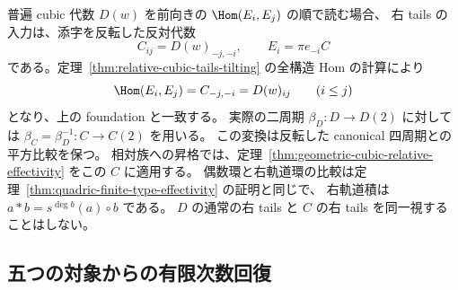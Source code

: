 普遍 cubic 代数 $D(w)$ を前向きの $\Hom(E_i,E_j)$ の順で読む場合、
右 tails の入力は、添字を反転した反対代数
\begin{equation}\label{eq:quintuple-right-tails-convention}
 C_{ij}=D(w)_{-j,-i},\qquad E_i=\pi e_{-i}C
\end{equation}
である。定理~\ref{thm:relative-cubic-tails-tilting} の全構造 Hom の計算により
\[
 \Hom(E_i,E_j)=C_{-j,-i}=D(w)_{ij}\qquad(i\le j)
\]
となり、上の foundation と一致する。
実際の二周期 $\beta_D:D\to D(2)$ に対しては
$\beta_C=\beta_D^{-1}:C\to C(2)$ を用いる。
この変換は反転した canonical 四周期との平方比較を保つ。
相対族への昇格では、定理~\ref{thm:geometric-cubic-relative-effectivity} をこの $C$ に適用する。
偶数環と右軌道環の比較は定理~\ref{thm:quadric-finite-type-effectivity} の証明と同じで、
右軌道積は $a*b=s^{\deg b}(a)\circ b$ である。
$D$ の通常の右 tails と $C$ の右 tails を同一視することはしない。

\subsection{五つの対象からの有限次数回復}

